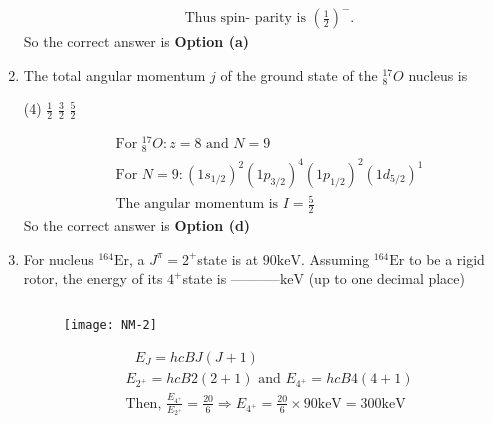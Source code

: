 \begin{enumerate}
\begin{answer}
\begin{align*}
		&\text { Thus spin- parity is }\left(\frac{1}{2}\right)^{-} \text {. }
		\end{align*}
		So the correct answer is \textbf{Option (a)}
	\end{answer}
	\item  The total angular momentum $j$ of the ground state of the ${ }_8^{17} O$ nucleus is
	{}
	\begin{tasks}(4)
		\task[\textbf{a.}]$\frac{1}{2}$
		\task[\textbf{c.}]$\frac{3}{2}$
		\task[\textbf{d.}]$\frac{5}{2}$ 
	\end{tasks}
	\begin{answer}
		\begin{align*}
		&\text{For ${ }_8^{17} O: z=8$ and $N=9$}\\
		&\text{For $N=9:\left(1 s_{1 / 2}\right)^2\left(1 p_{3 / 2}\right)^4\left(1 p_{1 / 2}\right)^2\left(1 d_{5 / 2}\right)^1$}\\
		&\text{The angular momentum is $I=\frac{5}{2}$}
		\end{align*}
		So the correct answer is \textbf{Option (d)}
	\end{answer}
	\item  For nucleus ${ }^{164} \mathrm{Er}$, a $J^\pi=2^{+}$state is at $90 \mathrm{keV}$. Assuming ${ }^{164} \mathrm{Er}$ to be a rigid rotor, the energy of its $4^{+}$state is -----------$\mathrm{keV}$ (up to one decimal place)
	{}
	\begin{answer}$\left. \right. $
		\begin{figure}[H]
			\centering
			\texttt{[image: NM-2]}
		\end{figure}
		\begin{align*}
		&\text{ $E_J=h c B J(J+1)$}\\
		&E_{2^{+}}=h c B 2(2+1) \text { and } E_{4^{+}}=h c B 4(4+1)\\
		&\text{Then, $\frac{E_{4^{+}}}{E_{2^{+}}}=\frac{20}{6} \Rightarrow E_{4^{+}}=\frac{20}{6} \times 90 \mathrm{keV}=300 \mathrm{keV}$}
		\end{align*}
	\end{answer}
\end{enumerate}
\setlength\arrayrulewidth{1pt}
